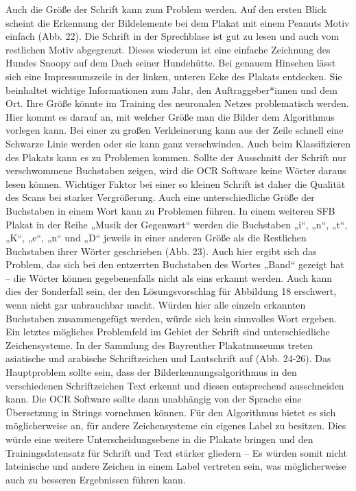 \documentclass[a4paper,12pt,ngerman]{article}
\begin{document}
Auch die Größe der Schrift kann zum Problem werden. Auf den ersten Blick scheint die Erkennung der Bildelemente bei dem Plakat mit einem Peanuts Motiv einfach (Abb. 22). Die Schrift in der Sprechblase ist gut zu lesen und auch vom restlichen Motiv abgegrenzt. Dieses wiederum ist eine einfache Zeichnung des Hundes Snoopy auf dem Dach seiner Hundehütte. Bei genauem Hinsehen lässt sich eine Impressumszeile in der linken, unteren Ecke des Plakats entdecken. Sie beinhaltet wichtige Informationen zum Jahr, den Auftraggeber*innen und dem Ort. Ihre Größe könnte im Training des neuronalen Netzes problematisch werden. Hier kommt es darauf an, mit welcher Größe man die Bilder dem Algorithmus vorlegen kann. Bei einer zu großen Verkleinerung kann aus der Zeile schnell eine Schwarze Linie werden oder sie kann ganz verschwinden. Auch beim Klassifizieren des Plakats kann es zu Problemen kommen. Sollte der Ausschnitt der Schrift nur verschwommene Buchstaben zeigen, wird die OCR Software keine Wörter daraus lesen können. Wichtiger Faktor bei einer so kleinen Schrift ist daher die Qualität des Scans bei starker Vergrößerung. Auch eine unterschiedliche Größe der Buchstaben in einem Wort kann zu Problemen führen. In einem weiteren SFB Plakat in der Reihe „Musik der Gegenwart“ werden die Buchstaben „i“, „n“, „t“, „K“, „e“, „n“ und „D“ jeweils in einer anderen Größe als die Restlichen Buchstaben ihrer Wörter geschrieben (Abb. 23). Auch hier ergibt sich das Problem, das sich bei den entzerrten Buchstaben des Wortes „Band“ gezeigt hat – die Wörter können gegebenenfalls nicht als eins erkannt werden. Auch kann dies der Sonderfall sein, der den Lösungsvorschlag für Abbildung 18 erschwert, wenn nicht gar unbrauchbar macht. Würden hier alle einzeln erkannten Buchstaben zusammengefügt werden, würde sich kein sinnvolles Wort ergeben. \\
Ein letztes mögliches Problemfeld im Gebiet der Schrift sind unterschiedliche Zeichensysteme. In der Sammlung des Bayreuther Plakatmuseums treten asiatische und arabische Schriftzeichen und Lautschrift auf (Abb. 24-26). Das Hauptproblem sollte sein, dass der Bilderkennungsalgorithmus in den verschiedenen Schriftzeichen Text erkennt und diesen entsprechend ausschneiden kann. Die OCR Software sollte dann unabhängig von der Sprache eine Übersetzung in Strings vornehmen können. Für den Algorithmus bietet es sich möglicherweise an, für andere Zeichensysteme ein eigenes Label zu besitzen. Dies würde eine weitere Unterscheidungsebene in die Plakate bringen und den Trainingsdatensatz für Schrift und Text stärker gliedern – Es würden somit nicht lateinische und andere Zeichen in einem Label vertreten sein, was möglicherweise auch zu besseren Ergebnissen führen kann. \\
\end{document}
